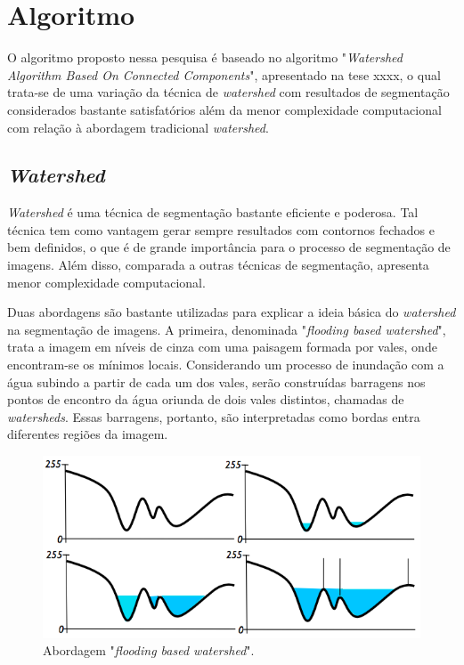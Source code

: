 \chapter{Algoritmo}\label{cap:algoritmo}

O algoritmo proposto nessa pesquisa é baseado no algoritmo "\textit{Watershed Algorithm Based On Connected Components}", apresentado na tese xxxx, o qual trata-se de uma variação da técnica de \textit{watershed} com resultados de segmentação considerados bastante satisfatórios além da menor complexidade computacional com relação à abordagem tradicional \textit{watershed}.

\section{\textit{Watershed}}\label{sec:watershed}
\textit{Watershed} é uma técnica de segmentação bastante eficiente e poderosa. Tal técnica tem como vantagem gerar sempre resultados com contornos fechados e bem definidos, o que é de grande importância para o processo de segmentação de imagens. Além disso, comparada a outras técnicas de segmentação, apresenta menor complexidade computacional.

Duas abordagens são bastante utilizadas para explicar a ideia básica do \textit{watershed} na segmentação de imagens. 
A primeira, denominada "\textit{flooding based watershed}", trata a imagem em níveis de cinza com uma paisagem formada por vales, onde encontram-se os mínimos locais. Considerando um processo de inundação com a água subindo a partir de cada um dos vales, serão construídas barragens nos pontos de encontro da água oriunda de dois vales distintos, chamadas de \textit{watersheds}. Essas barragens, portanto, são interpretadas como bordas entra diferentes regiões da imagem. 

	\begin{figure}[!htb]
       \begin{center}  
          \includegraphics[width=0.8\columnwidth]{img/abordagem_flooding.jpg}
           \caption{\label{fig:abordagem_flooding}Abordagem "\textit{flooding based watershed}".\cite{regseg1}}
       \end{center}
   \end{figure} 


